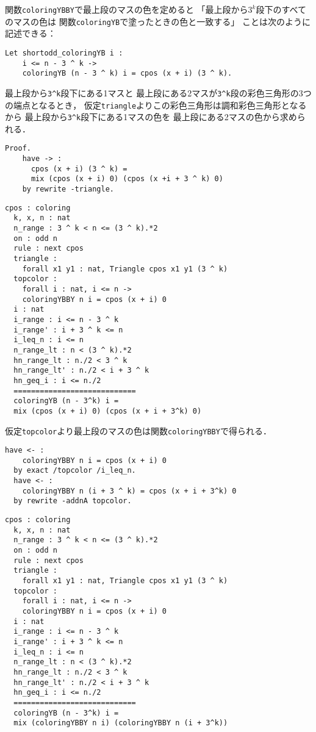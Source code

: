 関数{\tt{coloringYBBY}}で最上段のマスの色を定めると
「最上段から$3^k$段下のすべてのマスの色は
  関数{\tt{coloringYB}}で塗ったときの色と一致する」
ことは次のように記述できる：
\begin{lstlisting}[language=Coq]
  Let shortodd_coloringYB i :
    i <= n - 3 ^ k ->
    coloringYB (n - 3 ^ k) i = cpos (x + i) (3 ^ k).
\end{lstlisting}
最上段から{\tt{3\verb|^|k}}段下にある1マスと
最上段にある2マスが{\tt{3\verb|^|k}}段の彩色三角形の3つの端点となるとき，
仮定{\tt{triangle}}よりこの彩色三角形は調和彩色三角形となるから
最上段から{\tt{3\verb|^|k}}段下にある1マスの色を
最上段にある2マスの色から求められる．
\begin{lstlisting}[language=Coq]
  Proof.
    have -> :
      cpos (x + i) (3 ^ k) =
      mix (cpos (x + i) 0) (cpos (x +i + 3 ^ k) 0)
    by rewrite -triangle.
\end{lstlisting}
\begin{lstlisting}[language=Coq]
  cpos : coloring
  k, x, n : nat
  n_range : 3 ^ k < n <= (3 ^ k).*2
  on : odd n
  rule : next cpos
  triangle :
    forall x1 y1 : nat, Triangle cpos x1 y1 (3 ^ k)
  topcolor :
    forall i : nat, i <= n ->
    coloringYBBY n i = cpos (x + i) 0
  i : nat
  i_range : i <= n - 3 ^ k
  i_range' : i + 3 ^ k <= n
  i_leq_n : i <= n
  n_range_lt : n < (3 ^ k).*2
  hn_range_lt : n./2 < 3 ^ k
  hn_range_lt' : n./2 < i + 3 ^ k
  hn_geq_i : i <= n./2
  ============================
  coloringYB (n - 3^k) i =
  mix (cpos (x + i) 0) (cpos (x + i + 3^k) 0)
\end{lstlisting}
仮定{\tt{topcolor}}より最上段のマスの色は関数{\tt{coloringYBBY}}で得られる．
\begin{lstlisting}[language=Coq]
  have <- :
    coloringYBBY n i = cpos (x + i) 0
  by exact /topcolor /i_leq_n.
  have <- :
    coloringYBBY n (i + 3 ^ k) = cpos (x + i + 3^k) 0
  by rewrite -addnA topcolor.
\end{lstlisting}
\begin{lstlisting}[language=Coq]
  cpos : coloring
  k, x, n : nat
  n_range : 3 ^ k < n <= (3 ^ k).*2
  on : odd n
  rule : next cpos
  triangle :
    forall x1 y1 : nat, Triangle cpos x1 y1 (3 ^ k)
  topcolor :
    forall i : nat, i <= n ->
    coloringYBBY n i = cpos (x + i) 0
  i : nat
  i_range : i <= n - 3 ^ k
  i_range' : i + 3 ^ k <= n
  i_leq_n : i <= n
  n_range_lt : n < (3 ^ k).*2
  hn_range_lt : n./2 < 3 ^ k
  hn_range_lt' : n./2 < i + 3 ^ k
  hn_geq_i : i <= n./2
  ============================
  coloringYB (n - 3^k) i =
  mix (coloringYBBY n i) (coloringYBBY n (i + 3^k))
\end{lstlisting}
